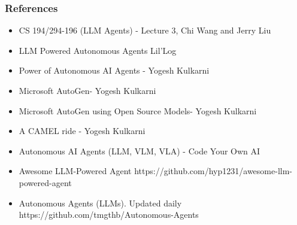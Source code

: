\begin{frame}[fragile]\frametitle{References}
\begin{itemize}
\item CS 194/294-196 (LLM Agents) - Lecture 3, Chi Wang and Jerry Liu
\item LLM Powered Autonomous Agents Lil'Log
\item Power of Autonomous AI Agents - Yogesh Kulkarni
\item Microsoft AutoGen- Yogesh Kulkarni
\item Microsoft AutoGen using Open Source Models- Yogesh Kulkarni
\item A CAMEL ride - Yogesh Kulkarni
\item Autonomous AI Agents (LLM, VLM, VLA) - Code Your Own AI
\item Awesome LLM-Powered Agent https://github.com/hyp1231/awesome-llm-powered-agent
\item Autonomous Agents (LLMs). Updated daily https://github.com/tmgthb/Autonomous-Agents
\end{itemize}
\end{frame}